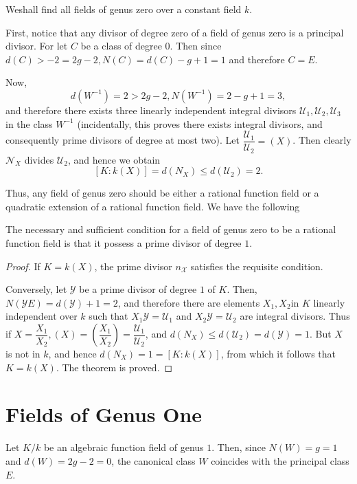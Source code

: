We\pageoriginale shall find all fields of genus zero over a constant field $k$.

First, notice that any divisor of degree zero of a field of genus zero
is a principal divisor. For let $C$ be a class of degree $0$. Then
since $d(C) > - 2 = 2g - 2, N(C) = d(C) - g + 1 =1$ and therefore $C =
E$.  

Now,
$$
d(W^{-1} ) = 2 > 2g - 2, N(W^{-1}) = 2 - g + 1 = 3,
$$
and therefore there exists three linearly independent integral
divisors $\mathscr{U}_1, \mathscr{U}_2, \mathscr{U}_3$ in the class
$W^{-1}$ (incidentally, this proves there exists integral divisors,
and consequently prime divisors of degree at most two). Let
$\dfrac{\mathscr{U}_1}{\mathscr{U}_2} = (X)$. Then clearly
$\mathscr{N}_X$ divides $\mathscr{U}_2$, and hence we obtain 
$$
[K : k(X)] = d(N_{X}) \le d(\mathscr{U}_2) = 2.
$$

Thus, any field of genus zero should be either a rational function
field or a quadratic extension of a rational function field. We have
the following 
\begin{theorem*}%
  The necessary and sufficient condition for a field of genus zero to
  be a rational function field is that it possess a prime divisor of
  degree $1$. 
\end{theorem*}

\begin{proof}
  If $K = k(X)$, the prime divisor $n_\mathcal{X}$ satisfies the
  requisite condition. 

  Conversely, let $\mathscr{Y}$ be a prime divisor of degree $1$ of
  $K$. Then, $N(\mathscr{Y} E) = d(\mathscr{Y}) + 1 = 2$, and
  therefore there are elements $X_1, X_2$\pageoriginale in $K$ linearly independent
  over $k$ such that $X_1 \mathscr{Y} = \mathscr{U}_1$ and $X_2
  \mathscr{Y} = \mathscr{U}_2 $ are integral divisors. Thus if $X =
  \dfrac{X_1}{X_2}, (X) = (\dfrac{X_1}{X_2}) =
  \dfrac{\mathscr{U}_1}{\mathscr{U}_2}$, and $d (N_{X}) \le d
  (\mathscr{U}_2) = d (\mathscr{Y}) = 1$. But $X$ is not in $k$, and
  hence $d(N_{X}) = 1 = [K : k (X)]$, from which it follows
  that $K = k(X)$. The theorem is proved. 
\end{proof}

\section{Fields of Genus One}\label{chap9:sec19}%

Let $K/k$ be an algebraic function field of genus $1$. Then, since
$N(W) = g = 1$ and $d(W) = 2g-2=0$, the canonical class $W$ coincides
with the principal class $E$. 

